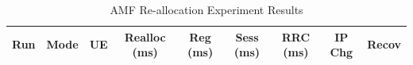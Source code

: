 \begin{table}[ht]
\centering
\begin{tabular}{|c|c|c|c|c|c|c|c|c|}
\hline
Run & Mode & UE & Realloc (ms) & Reg (ms) & Sess (ms) & RRC (ms) & IP Chg & Recov \\
\hline
\hline
\end{tabular}
\caption{AMF Re-allocation Experiment Results}
\label{tab:amf_realloc}
\end{table}
